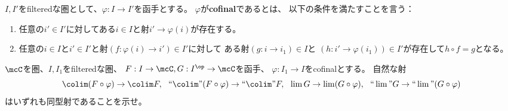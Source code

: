 \documentclass[uplatex,dvipdfmx]{jsarticle}
\begin{document}
\maketitle\HeaderCommentA
\section{}
\fi



\begin{prob}\label{1.38}
  \(I,I'\)をfilteredな圏として、\(\varphi:I\to I'\)を函手とする。
  \(\varphi\)が\textbf{cofinal}であるとは、
  以下の条件を満たすことを言う：
  \begin{enumerate}
    \item
    任意の\(i'\in I'\)に対してある\(i\in I\)と射\(i'\to \varphi(i)\)が存在する。
    \item
    任意の\(i\in I\)と\(i'\in I'\)と射\((f:\varphi(i)\to i')\in I'\)に対して
    ある射\((g:i\to i_1)\in I\)と
    \((h:i'\to \varphi(i_1))\in I'\)が存在して\(h\circ f = g\)となる。
  \end{enumerate}
  \(\mcC\)を圏、\(I,I_1\)をfilteredな圏、
  \(F:I\to \mcC, G:I^{\op}\to \mcC\)を函手、
  \(\varphi:I_1\to I\)をcofinalとする。
  自然な射
  \[
  \colim (F\circ \varphi) \to \colim F, \ \
  ``\colim" (F\circ \varphi) \to ``\colim" F, \ \
  \lim G \to \lim (G\circ \varphi), \ \
  ``\lim" G \to ``\lim" (G\circ \varphi)
  \]
  はいずれも同型射であることを示せ。
\end{prob}
\end{document}
